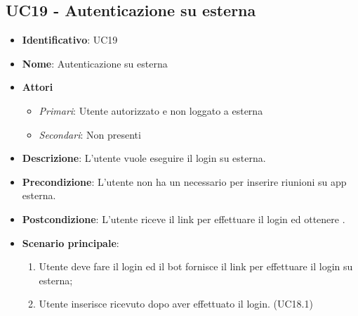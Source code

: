 \subsection{UC19 - Autenticazione su  esterna}
\begin{itemize}
	\item \textbf{Identificativo}: UC19
	\item \textbf{Nome}: Autenticazione su  esterna
	\item \textbf{Attori}
	\begin{itemize} 
		\item \textit{Primari}: Utente autorizzato e non loggato a  esterna
		\item \textit{Secondari}: Non presenti
	\end{itemize}
	\item \textbf{Descrizione}: L'utente vuole eseguire il login su  esterna.
	\item \textbf{Precondizione}: L'utente non ha un  necessario per inserire riunioni su app esterna.
	\item \textbf{Postcondizione}: L'utente riceve il link per effettuare il login ed ottenere .
	\item \textbf{Scenario principale}: \begin{enumerate}
		\item Utente deve fare il login ed il bot fornisce il link per effettuare il login su  esterna; 
		\item Utente inserisce  ricevuto dopo aver effettuato il login. (UC18.1)
	\end{enumerate}
\end{itemize}
